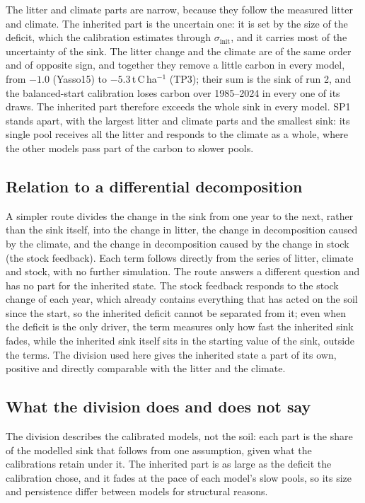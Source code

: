 \documentclass[../HIKET_draft_v1.tex]{subfiles}
\begin{document}
The litter and climate parts are narrow, because they follow the measured litter and climate.
The inherited part is the uncertain one: it is set by the size of the deficit, which the
calibration estimates through $\sigma_{\mathrm{init}}$, and it carries most of the uncertainty of
the sink. The litter change and the climate are of the same order and of opposite sign, and
together they remove a little carbon in every model, from $-1.0$ (Yasso15) to
$-5.3$\,t\,C\,ha$^{-1}$ (TP3); their sum is the sink of run 2, and the balanced-start calibration
loses carbon over 1985--2024 in every one of its draws. The inherited part therefore exceeds the
whole sink in every model. SP1 stands apart, with the largest litter and climate parts and the
smallest sink: its single pool receives all the litter and responds to the climate as a whole,
where the other models pass part of the carbon to slower pools.

\subsection{Relation to a differential decomposition}

A simpler route divides the change in the sink from one year to the next, rather than the
sink itself, into the change in litter, the change in decomposition caused by the climate,
and the change in decomposition caused by the change in stock (the stock feedback). Each
term follows directly from the series of litter, climate and stock, with no further
simulation. The route answers a different question and has no part for the inherited state.
The stock feedback responds to the stock change of each year, which already contains
everything that has acted on the soil since the start, so the inherited deficit cannot be
separated from it; even when the deficit is the only driver, the term measures only how fast
the inherited sink fades, while the inherited sink itself sits in the starting value of the
sink, outside the terms. The division used here gives the inherited state a part of its own,
positive and directly comparable with the litter and the climate.

\subsection{What the division does and does not say}

The division describes the calibrated models, not the soil: each part is the share of the
modelled sink that follows from one assumption, given what the calibrations retain under it.
The inherited part is as large as the deficit the calibration chose, and it fades at the pace
of each model's slow pools, so its size and persistence differ between models for structural
reasons.
\end{document}
